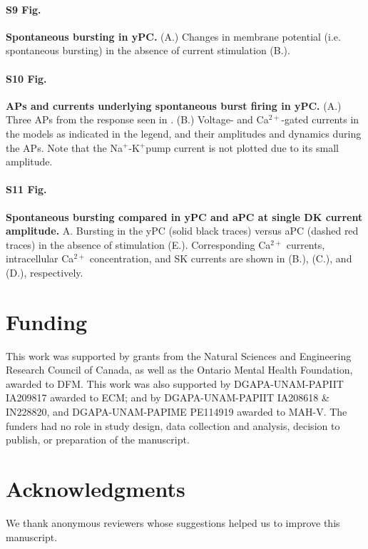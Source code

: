 \documentclass[10pt,letterpaper]{article}
\newcommand{\Ca}{Ca$^{2+}$}
\newcommand{\K}{K$^{+}$}
\newcommand{\Na}{Na$^{+}$}
\begin{document}
\paragraph*{S9 Fig.}
\label{S9_Fig}
{\bf Spontaneous bursting in yPC.} (A.) Changes in membrane potential (i.e. spontaneous bursting) in the absence of current stimulation (B.).

\paragraph*{S10 Fig.}
\label{S10_Fig}
{\bf APs and currents underlying spontaneous burst firing in yPC.} (A.) Three APs from the response seen in . (B.) Voltage- and \Ca-gated currents in the models as indicated in the legend, and their amplitudes and dynamics during the APs. Note that the \Na-\K pump current is not plotted due to its small amplitude.

\paragraph*{S11 Fig.}
\label{S11_Fig}
{\bf Spontaneous bursting compared in yPC and aPC at single DK current amplitude.} A. Bursting in the yPC (solid black traces) versus aPC (dashed red traces) in the absence of stimulation (E.). Corresponding {\Ca} currents, intracellular {\Ca} concentration, and SK currents are shown in (B.), (C.), and (D.), respectively.

\section*{Funding} 
This work was supported by grants from the Natural Sciences and Engineering Research Council of Canada, as well as the Ontario Mental Health Foundation, awarded to DFM. This work was also supported by DGAPA-UNAM-PAPIIT IA209817 awarded to ECM; and by DGAPA-UNAM-PAPIIT IA208618 \& IN228820, and DGAPA-UNAM-PAPIME PE114919 awarded to MAH-V. The funders had no role in study design, data collection and analysis, decision to publish, or preparation of the manuscript.  

\section*{Acknowledgments}
We thank anonymous reviewers whose suggestions helped us to improve this manuscript.

\nolinenumbers

\end{document}
